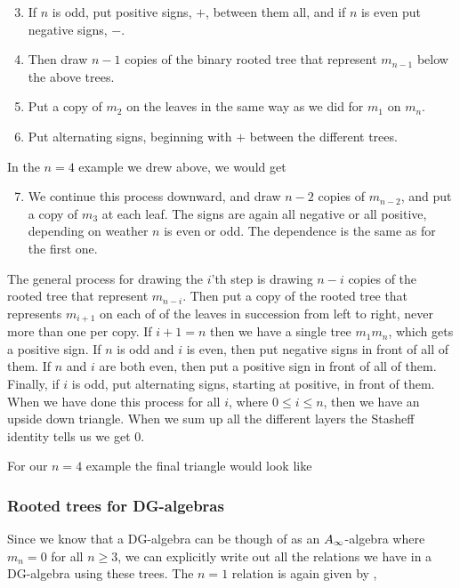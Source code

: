 \begin{enumerate}
\setcounter{enumi}{2}
    \item If $n$ is odd, put positive signs, $+$, between them all, and if $n$ is even put negative signs, $-$. 
    \item Then draw $n-1$ copies of the binary rooted tree that represent $m_{n-1}$ below the above trees. \item Put a copy of $m_2$ on the leaves in the same way as we did for $m_1$ on $m_n$.
    \item Put alternating signs, beginning with $+$ between the different trees.
\end{enumerate}

In the $n=4$ example we drew above, we would get


\begin{enumerate}
\setcounter{enumi}{6}
    \item We continue this process downward, and draw $n-2$ copies of $m_{n-2}$, and put a copy of $m_3$ at each leaf. The signs are again all negative or all positive, depending on weather $n$ is even or odd. The dependence is the same as for the first one. 
\end{enumerate}

The general process for drawing the $i$'th step is drawing $n-i$ copies of the rooted tree that represent $m_{n-i}$. Then put a copy of the rooted tree that represents $m_{i+1}$ on each of of the leaves in succession from left to right, never more than one per copy. If $i+1=n$ then we have a single tree $m_1 m_{n}$, which gets a positive sign. If $n$ is odd and $i$ is even, then put negative signs in front of all of them. If $n$ and $i$ are both even, then put a positive sign in front of all of them. Finally, if $i$ is odd, put alternating signs, starting at positive, in front of them. When we have done this process for all $i$, where $0\leq i \leq n$, then we have an upside down triangle. When we sum up all the different layers the Stasheff identity tells us we get $0$. 

For our $n=4$ example the final triangle would look like



\subsubsection{Rooted trees for DG-algebras}

Since we know that a DG-algebra can be though of as an $A_{\infty}$-algebra where $m_n = 0$ for all $n\geq 3$, we can explicitly write out all the relations we have in a DG-algebra using these trees. The $n=1$ relation is again given by
,  

